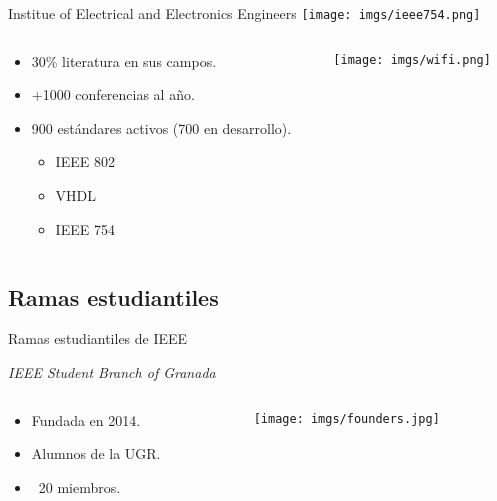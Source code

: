 \begin{frame}{Institue of Electrical and Electronics Engineers}
    \centering
    \texttt{[image: imgs/ieee754.png]}
    
    \begin{columns}\begin{column}{0.6\textwidth}
        \begin{itemize}
            \item 30\% literatura en sus campos.
            \item +1000 conferencias al año.
            \item 900 estándares activos (700 en desarrollo).
            \begin{itemize}
                \item IEEE 802
                \item VHDL
                \item IEEE 754
            \end{itemize}
        \end{itemize}
    \end{column}\begin{column}{0.4\textwidth}
        \texttt{[image: imgs/wifi.png]}
    \end{column}\end{columns}
\end{frame}

\subsection{Ramas estudiantiles}
\begin{frame}{Ramas estudiantiles de IEEE}
    \begin{center}
        \Large
        \textit{IEEE Student Branch of Granada}
    \end{center}
    
    \begin{columns}\begin{column}{0.50\textwidth}
        \begin{itemize}
            \item Fundada en 2014.
            \item Alumnos de la UGR.
            \item ~20 miembros.
        \end{itemize}
    \end{column}\begin{column}{0.50\textwidth}
        \centering\texttt{[image: imgs/founders.jpg]}
    \end{column}\end{columns}
\end{frame}

